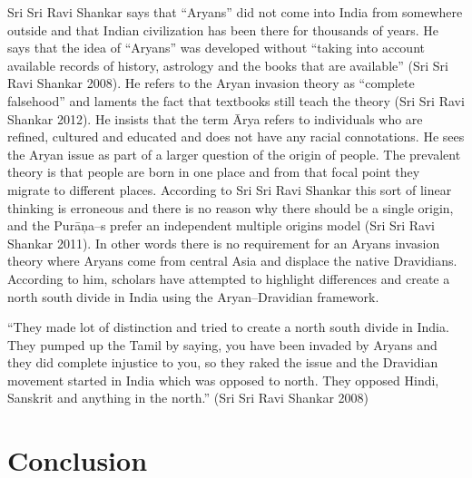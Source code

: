 Sri Sri Ravi Shankar says that “Aryans” did not come into India from somewhere outside and that Indian civilization has been there for thousands of years. He says that the idea of “Aryans” was developed without “taking into account available records of history, astrology and the books that are available” (Sri Sri Ravi Shankar 2008). He refers to the Aryan invasion theory as “complete falsehood” and laments the fact that textbooks still teach the theory (Sri Sri Ravi Shankar 2012). He insists that the term Ārya refers to individuals who are refined, cultured and educated and does not have any racial connotations. He sees the Aryan issue as part of a larger question of the origin of people. The prevalent theory is that people are born in one place and from that focal point they migrate to different places. According to Sri Sri Ravi Shankar this sort of linear thinking is erroneous and there is no reason why there should be a single origin, and the Purāņa–s prefer an independent multiple origins model (Sri Sri Ravi Shankar 2011). In other words there is no requirement for an Aryans invasion theory where Aryans come from central Asia and displace the native Dravidians. According to him, scholars have attempted to highlight differences and create a north south divide in India using the Aryan–Dravidian framework.

\begin{myquote}
“They made lot of distinction and tried to create a north south divide in India. They pumped up the Tamil by saying, you have been invaded by Aryans and they did complete injustice to you, so they raked the issue and the Dravidian movement started in India which was opposed to north. They opposed Hindi, Sanskrit and anything in the north.” (Sri Sri Ravi Shankar 2008)
\end{myquote}


\section*{Conclusion}

